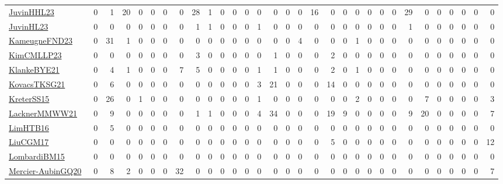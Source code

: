 \documentclass[a4paper]{article}
\begin{document}
{\begin{longtable}{l*{30}{r}}
\href{papers/JuvinHHL23.pdf}{JuvinHHL23}~\cite{JuvinHHL23} & 0 & 1 & 20 & 0 & 0 & 0 & 0 & 28 & 1 & 0 & 0 & 0 & 0 & 0 & 0 & 0 & 16 & 0 & 0 & 0 & 0 & 0 & 0 & 29 & 0 & 0 & 0 & 0 & 0 & 0\\
\href{papers/JuvinHL23.pdf}{JuvinHL23}~\cite{JuvinHL23} & 0 & 0 & 0 & 0 & 0 & 0 & 0 & 1 & 1 & 0 & 0 & 0 & 1 & 0 & 0 & 0 & 0 & 0 & 0 & 0 & 0 & 0 & 0 & 1 & 0 & 0 & 0 & 0 & 0 & 0\\
\href{papers/KameugneFND23.pdf}{KameugneFND23}~\cite{KameugneFND23} & 0 & 31 & 1 & 0 & 0 & 0 & 0 & 0 & 0 & 0 & 0 & 0 & 0 & 0 & 0 & 4 & 0 & 0 & 0 & 1 & 0 & 0 & 0 & 0 & 0 & 0 & 0 & 0 & 0 & 0\\
\href{papers/KimCMLLP23.pdf}{KimCMLLP23}~\cite{KimCMLLP23} & 0 & 0 & 0 & 0 & 0 & 0 & 0 & 3 & 0 & 0 & 0 & 0 & 0 & 1 & 0 & 0 & 0 & 2 & 0 & 0 & 0 & 0 & 0 & 0 & 0 & 0 & 0 & 0 & 0 & 0\\
\href{papers/KlankeBYE21.pdf}{KlankeBYE21}~\cite{KlankeBYE21} & 0 & 4 & 1 & 0 & 0 & 0 & 7 & 5 & 0 & 0 & 0 & 0 & 1 & 1 & 0 & 0 & 0 & 2 & 0 & 1 & 0 & 0 & 0 & 0 & 0 & 0 & 0 & 0 & 0 & 0\\
\href{papers/KovacsTKSG21.pdf}{KovacsTKSG21}~\cite{KovacsTKSG21} & 0 & 6 & 0 & 0 & 0 & 0 & 0 & 0 & 0 & 0 & 0 & 0 & 3 & 21 & 0 & 0 & 0 & 14 & 0 & 0 & 0 & 0 & 0 & 0 & 0 & 0 & 0 & 0 & 0 & 0\\
\href{papers/KreterSS15.pdf}{KreterSS15}~\cite{KreterSS15} & 0 & 26 & 0 & 1 & 0 & 0 & 0 & 0 & 0 & 0 & 0 & 0 & 1 & 0 & 0 & 0 & 0 & 0 & 0 & 2 & 0 & 0 & 0 & 0 & 7 & 0 & 0 & 0 & 0 & 3\\
\href{papers/LacknerMMWW21.pdf}{LacknerMMWW21}~\cite{LacknerMMWW21} & 0 & 9 & 0 & 0 & 0 & 0 & 0 & 1 & 1 & 0 & 0 & 0 & 4 & 34 & 0 & 0 & 0 & 19 & 9 & 0 & 0 & 0 & 0 & 9 & 20 & 0 & 0 & 0 & 0 & 7\\
\href{papers/LimHTB16.pdf}{LimHTB16}~\cite{LimHTB16} & 0 & 5 & 0 & 0 & 0 & 0 & 0 & 0 & 0 & 0 & 0 & 0 & 0 & 0 & 0 & 0 & 0 & 0 & 0 & 0 & 0 & 0 & 0 & 0 & 0 & 0 & 0 & 0 & 0 & 0\\
\href{papers/LiuCGM17.pdf}{LiuCGM17}~\cite{LiuCGM17} & 0 & 0 & 0 & 0 & 0 & 0 & 0 & 0 & 0 & 0 & 0 & 0 & 0 & 0 & 0 & 0 & 0 & 5 & 0 & 0 & 0 & 0 & 0 & 0 & 0 & 0 & 0 & 0 & 0 & 12\\
\href{papers/LombardiBM15.pdf}{LombardiBM15}~\cite{LombardiBM15} & 0 & 0 & 0 & 0 & 0 & 0 & 0 & 0 & 0 & 0 & 0 & 0 & 0 & 0 & 0 & 0 & 0 & 0 & 0 & 0 & 0 & 0 & 0 & 0 & 0 & 0 & 0 & 0 & 0 & 0\\
\href{papers/Mercier-AubinGQ20.pdf}{Mercier-AubinGQ20}~\cite{Mercier-AubinGQ20} & 0 & 8 & 2 & 0 & 0 & 0 & 32 & 0 & 0 & 0 & 0 & 0 & 0 & 0 & 0 & 0 & 0 & 0 & 0 & 0 & 0 & 0 & 0 & 0 & 0 & 0 & 0 & 0 & 0 & 7\\

\end{longtable}}
\end{document}

